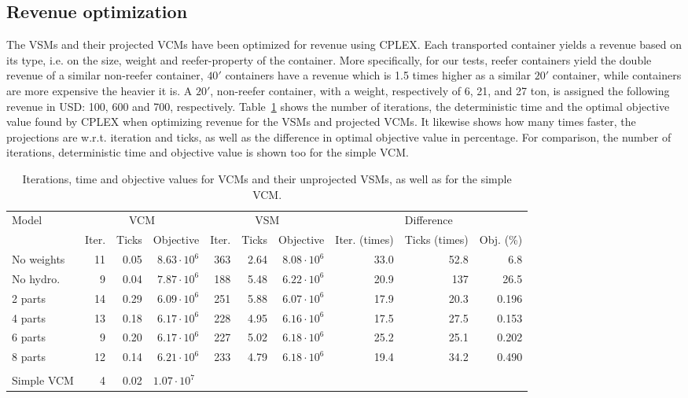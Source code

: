 \subsection{Revenue optimization}
The VSMs and their projected VCMs have been optimized for revenue using CPLEX. Each transported container yields a revenue based on its type, i.e. on the size, weight and reefer-property of the container. More specifically, for our tests, reefer containers yield the double revenue of a similar non-reefer container, $40'$ containers have a revenue which is 1.5 times higher as a similar $20'$ container, while containers are more expensive the heavier it is. A $20'$, non-reefer container, with a weight, respectively of 6, 21, and 27 ton, is assigned the following revenue in USD: 100, 600 and 700, respectively. Table~\ref{tab:usingProjections} shows the number of iterations, the deterministic time and the optimal objective value found by CPLEX when optimizing revenue for the VSMs and projected VCMs. It likewise shows how many times faster, the projections are w.r.t. iteration and ticks, as well as the difference in optimal objective value in percentage. For comparison, the number of iterations, deterministic time and objective value is shown too for the simple VCM.
\begin{table}[htbp]
\centering
\begin{tabular}{l|rrr|rrr|rrr}
\toprule
Model&\multicolumn{3}{c|}{VCM}&\multicolumn{3}{c|}{VSM}&\multicolumn{3}{c}{Difference}\\
&Iter.&Ticks&Objective&Iter.&Ticks&Objective&Iter. (times)&Ticks (times)&Obj. (\%)\\ 
\midrule
No weights&	11 & 0.05 & $8.63\cdot 10^6$ &	363 & 2.64&$8.08\cdot 10^6$
&33.0&52.8&6.8\\
\midrule
{No hydro.}& 9 & 0.04 &$7.87\cdot 10^6$&	188 & 5.48&$6.22 \cdot 10^6$
&20.9&137&26.5\\
\midrule
{2 parts}& 14 & 0.29 & $6.09\cdot 10^6$ &	251 & 5.88&$6.07\cdot 10^6$
&17.9&20.3&0.196\\
\midrule
{4 parts} &13 & 0.18 &$6.17\cdot 10^6$ & 228 & 4.95 &$6.16\cdot 10^6$
&17.5&27.5&0.153\\
\midrule
{6 parts} &9 & 0.20& $6.17\cdot 10^6$ &227 & 5.02 &$6.18\cdot 10^6$
&25.2&25.1&0.202\\
\midrule
{8 parts} &12 & 0.14& $6.21\cdot 10^6$ & 233 & 4.79 &$6.18\cdot 10^6$
&19.4&34.2&0.490\\
\bottomrule
\multicolumn{10}{c}{}\\
\cmidrule{1-4}
Simple VCM & 4 & 0.02 &\multicolumn{2}{l}{$1.07\cdot 10^7$}\\
\cmidrule{1-4}
\end{tabular}
\caption{Iterations, time and objective values for VCMs and their unprojected VSMs, as well as for the simple VCM. }
\label{tab:usingProjections}
\end{table}

